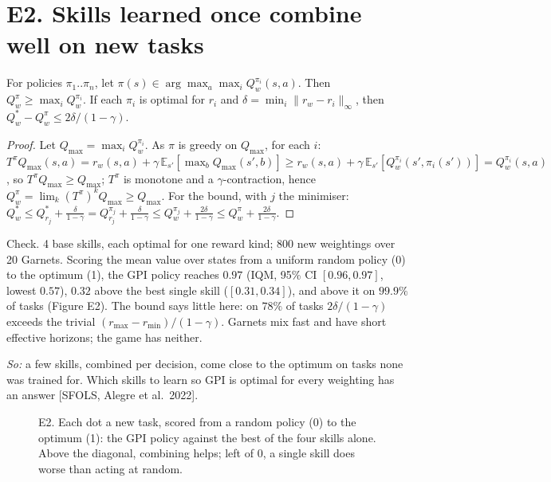 \section*{E2. Skills learned once combine well on new tasks}
\begin{theorem} For policies $\pi_1..\pi_n$, let $\pi(s)\in\arg\max_a\max_iQ^{\pi_i}_w(s,a)$.
Then $Q^\pi_w\ge\max_iQ^{\pi_i}_w$. If each $\pi_i$ is optimal for $r_i$ and $\delta=\min_i\|r_w-r_i\|_\infty$, then
$Q^*_w-Q^\pi_w\le 2\delta/(1-\gamma)$.\end{theorem}
\begin{proof} Let $Q_{\max}=\max_iQ^{\pi_i}_w$. As $\pi$ is greedy on $Q_{\max}$, for each $i$:
$T^{\pi}Q_{\max}(s,a)=r_w(s,a)+\gamma\,\mathbb E_{s'}[\max_bQ_{\max}(s',b)]\ge r_w(s,a)+\gamma\,\mathbb E_{s'}[Q^{\pi_i}_w(s',\pi_i(s'))]=Q^{\pi_i}_w(s,a)$,
so $T^\pi Q_{\max}\ge Q_{\max}$; $T^\pi$ is monotone and a $\gamma$-contraction, hence
$Q^\pi_w=\lim_k(T^\pi)^kQ_{\max}\ge Q_{\max}$. For the bound, with $j$ the minimiser:
$Q^*_w\le Q^*_{r_j}+\tfrac{\delta}{1-\gamma}=Q^{\pi_j}_{r_j}+\tfrac{\delta}{1-\gamma}\le Q^{\pi_j}_w+\tfrac{2\delta}{1-\gamma}\le Q^\pi_w+\tfrac{2\delta}{1-\gamma}$.\end{proof}
\noindent Check. 4 base skills, each optimal for one reward kind; 800 new weightings over 20 Garnets. Scoring the
mean value over states from a uniform random policy (0) to the optimum (1), the GPI policy reaches $0.97$ (IQM, 95\% CI
$[0.96, 0.97]$, lowest $0.57$), $0.32$ above the best single skill ($[0.31, 0.34]$), and above it on $99.9\%$ of tasks
(Figure E2). The bound says little here: on $78\%$ of tasks $2\delta/(1-\gamma)$ exceeds the trivial
$(r_{\max}-r_{\min})/(1-\gamma)$. Garnets mix fast and have short effective horizons; the game has neither.

\emph{So:} a few skills, combined per decision, come close to the optimum on tasks none was trained for. Which skills
to learn so GPI is optimal for every weighting has an answer [SFOLS, Alegre et al.\ 2022].

\begin{figure}[h]\centering
{}
\caption{E2. Each dot a new task, scored from a random policy (0) to the optimum (1): the GPI policy against the best
of the four skills alone. Above the diagonal, combining helps; left of 0, a single skill does worse than acting at random.}
\end{figure}

